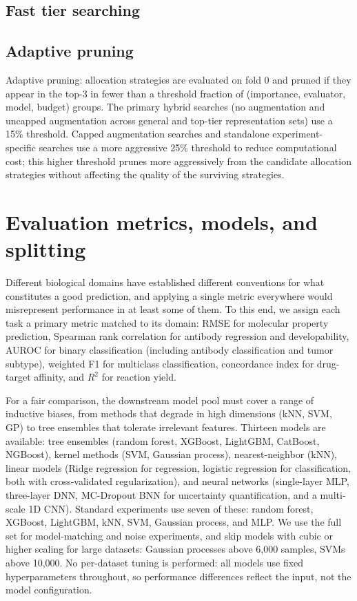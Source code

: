 {\subsection{Fast tier searching}

\subsection{Adaptive pruning}

Adaptive pruning: allocation strategies are evaluated on fold 0 and pruned if they appear in the top-3 in fewer than a threshold fraction of (importance, evaluator, model, budget) groups. The primary hybrid searches (no augmentation and uncapped augmentation across general and top-tier representation sets) use a 15\% threshold. Capped augmentation searches and standalone experiment-specific searches use a more aggressive 25\% threshold to reduce computational cost; this higher threshold prunes more aggressively from the candidate allocation strategies without affecting the quality of the surviving strategies.


\section{Evaluation metrics, models, and splitting}

Different biological domains have established different conventions for what constitutes a good prediction, and applying a single metric everywhere would misrepresent performance in at least some of them. To this end, we assign each task a primary metric matched to its domain: RMSE for molecular property prediction, Spearman rank correlation for antibody regression and developability, AUROC for binary classification (including antibody classification and tumor subtype), weighted F1 for multiclass classification, concordance index for drug-target affinity, and $R^2$ for reaction yield.

For a fair comparison, the downstream model pool must cover a range of inductive biases, from methods that degrade in high dimensions (kNN, SVM, GP) to tree ensembles that tolerate irrelevant features. Thirteen models are available: tree ensembles (random forest, XGBoost, LightGBM, CatBoost, NGBoost), kernel methods (SVM, Gaussian process), nearest-neighbor (kNN), linear models (Ridge regression for regression, logistic regression for classification, both with cross-validated regularization), and neural networks (single-layer MLP, three-layer DNN, MC-Dropout BNN for uncertainty quantification, and a multi-scale 1D CNN). Standard experiments use seven of these: random forest, XGBoost, LightGBM, kNN, SVM, Gaussian process, and MLP. We use the full set for model-matching and noise experiments, and skip models with cubic or higher scaling for large datasets: Gaussian processes above 6,000 samples, SVMs above 10,000. No per-dataset tuning is performed: all models use fixed hyperparameters throughout, so performance differences reflect the input, not the model configuration.

}
